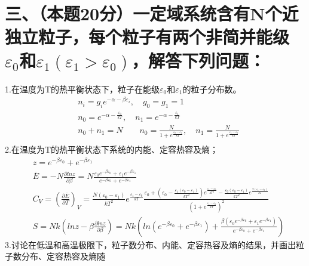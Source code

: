 \documentclass[UTF8]{ctexart}
\begin{document}
\section*{三、（本题20分）一定域系统含有N个近独立粒子，每个粒子有两个非简并能级
  $\varepsilon_0$和$\varepsilon_1(\varepsilon_1>\varepsilon_0)$，解答下列问题：}
1.在温度为T的热平衡状态下，粒子在能级$\varepsilon_0$和$\varepsilon_1$的粒子分布数。
\begin{equation*}
  \begin{aligned}
     & n_i=g_ie^{-\alpha-\beta\varepsilon_i},\quad g_0=g_1=1   \\
     & n_0=e^{-\alpha-\frac{\varepsilon_0}{kT}},
    \quad n_1=e^{-\alpha-\frac{\varepsilon_1}{kT}}             \\
     & n_0+n_1=N\quad\quad
    n_0=\frac{N}{1+e^{\frac{\varepsilon_0-\varepsilon_1}{kT}}},\quad
    n_1=\frac{N}{1+e^{\frac{\varepsilon_1-\varepsilon_0}{kT}}} \\
  \end{aligned}
\end{equation*}
2.在温度为T的热平衡状态下系统的内能、定容热容及熵；
\begin{equation*}
  \begin{aligned}
     & z = e^{-\beta\varepsilon_0}+e^{-\beta\varepsilon_1} \\
     & \overline{E}=-N\frac{\partial lnz}{\partial\beta}
    =N\frac{\varepsilon_0e^{-\beta\varepsilon_0}+\varepsilon_1e^{-\beta\varepsilon_1}}
    {e^{-\beta\varepsilon_0}+e^{-\beta\varepsilon_1}}      \\
     & C_V=(\frac{\partial\overline{E}}{\partial T})_V
    =\frac{N(\varepsilon_0-\varepsilon_1)}{kT^2}e^{\frac{\varepsilon_1-\varepsilon_0}{kT}}
    \frac{\varepsilon_0+
    (\varepsilon_0-\frac{\varepsilon_1(\varepsilon_0-\varepsilon_1)}{kT^2})
    e^{\frac{\varepsilon_1-\varepsilon_0}{kT^2}}
    -\frac{\varepsilon_0(\varepsilon_0-\varepsilon_1)}{kT^2}
    e^{\frac{2(\varepsilon_1-\varepsilon_0)}{kT}}
    }
    {(1+e^{\frac{\varepsilon_1-\varepsilon_0}{kT}})^2}     \\
     & S=Nk(lnz-\beta\frac{\partial lnz}{\partial\beta})=
    Nk(ln(e^{-\beta\varepsilon_0}+e^{-\beta\varepsilon_1})+
    \frac{\beta(\varepsilon_0e^{-\beta\varepsilon_0}+\varepsilon_1e^{-\beta\varepsilon_1})}
    {e^{-\beta\varepsilon_0}+e^{-\beta\varepsilon_1}})
  \end{aligned}
\end{equation*}
3.讨论在低温和高温极限下，粒子数分布、内能、定容热容及熵的结果，并画出粒子数分布、定容热容及熵随
\end{document}
